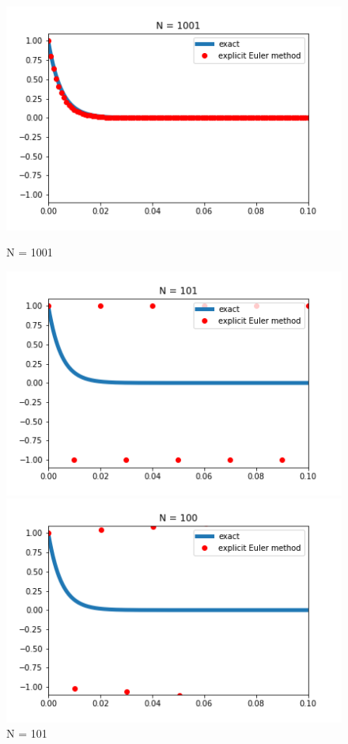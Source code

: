 \documentclass[11pt]{article}
\begin{document}
\begin{figure}[h]
    \begin{center}
    \begin{minipage}[h]{0.3\linewidth}
    \includegraphics[width=1\linewidth]{explicit_1001.png}
    \caption{N = 1001}
    \label{p2}
    \end{minipage}
    \hfill
    \begin{minipage}[h]{0.3\linewidth}
    \includegraphics[width=1\linewidth]{explicit_101.png}
    \caption{N = 101}
    \label{p3}
    \end{minipage}
    \hfill
    \begin{minipage}[h]{0.3\linewidth}
    \includegraphics[width=1\linewidth]{explicit_100.png}

\end{minipage}
\end{center}
\end{figure}
\end{document}
